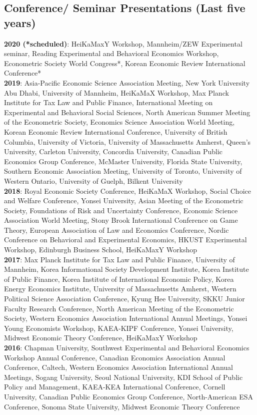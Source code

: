 \documentclass[margin, letterpaper]{res}
\begin{document}
\begin{resume}
\section{Conference/ Seminar Presentations (Last five years)}
\textbf{2020 (*scheduled)}: HeiKaMaxY Workshop, Mannheim/ZEW Experimental seminar, Reading Experimental and Behavioral Economics Workshop, Econometric Society World Congress*, Korean Economic Review International Conference*\\
\textbf{2019}: Asia-Pacific Economic Science Association Meeting, New York University Abu Dhabi, University of Mannheim, HeiKaMaX Workshop, Max Planck Institute for Tax Law and Public Finance, International Meeting on Experimental and Behavioral Social Sciences, North American Summer Meeting of the Econometric Society, Economics Science Association World Meeting, Korean Economic Review International Conference, University of British Columbia, University of Victoria, University of Massachusetts Amherst, Queen's University, Carleton University, Concordia University, Canadian Public Economics Group Conference, McMaster University, Florida State University, Southern Economic Association Meeting, University of Toronto, University of Western Ontario, University of Guelph, Bilkent University\\
\textbf{2018}: Royal Economic Society Conference, HeiKaMaX Workshop, Social Choice and Welfare Conference, Yonsei University, Asian Meeting of the Econometric Society, Foundations of Risk and Uncertainty Conference, Economic Science Association World Meeting, Stony Brook International Conference on Game Theory, European Association of Law and Economics Conference, Nordic Conference on Behavioral and Experimental Economics, HKUST Experimental Workshop, Edinburgh Business School, HeiKaMaxY Workshop\\
\textbf{2017}: Max Planck Institute for Tax Law and Public Finance, University of Mannheim, Korea Informational Society Development Institute, Korea Institute of Public Finance, Korea Institute of International Economic Policy, Korea Energy Economics Institute, University of Massachusetts Amherst, Western Political Science Association Conference, Kyung Hee University, SKKU Junior Faculty Research Conference, North American Meeting of the Econometric Society, Western Economics Association International Annual Meetings, Yonsei Young Economists Workshop, KAEA-KIPF Conference, Yonsei University, Midwest Economic Theory Conference, HeiKaMaxY Workshop\\
\textbf{2016}: Chapman University, Southwest Experimental and Behavioral Economics Workshop Annual Conference, Canadian Economics Association Annual Conference, Caltech, Western Economics Association International Annual Meetings, Sogang University, Seoul National University, KDI School of Public Policy and Management, KAEA-KEA International Conference, Cornell University, Canadian Public Economics Group Conference, North-American ESA Conference, Sonoma State University, Midwest Economic Theory Conference%

\end{resume}
\end{document}
